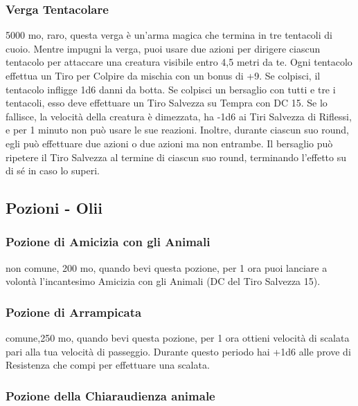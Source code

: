 \begin{multicols}{2}
\subsubsection*{Verga Tentacolare}
5000 mo, raro, questa verga è un'arma magica che termina in tre tentacoli di cuoio. Mentre impugni la verga, puoi usare due azioni per dirigere ciascun tentacolo per attaccare una creatura visibile entro 4,5 metri da te. Ogni tentacolo effettua un Tiro per Colpire da mischia con un bonus di +9. Se colpisci, il tentacolo infligge 1d6 danni da botta. Se colpisci un bersaglio con tutti e tre i tentacoli, esso deve effettuare un Tiro Salvezza su Tempra con DC 15. Se lo fallisce, la velocità della creatura è dimezzata, ha -1d6 ai Tiri Salvezza di Riflessi, e per 1 minuto non può usare le sue reazioni. Inoltre, durante ciascun suo round, egli può effettuare due azioni o due azioni ma non entrambe. Il bersaglio può ripetere il Tiro Salvezza al termine di ciascun suo round, terminando l'effetto su di sé in caso lo superi.


\subsection{Pozioni - Olii}

\subsubsection*{Pozione di Amicizia con gli Animali}

non comune, 200 mo, quando bevi questa pozione, per 1 ora puoi lanciare a volontà l'incantesimo Amicizia con gli Animali (DC del Tiro Salvezza 15).

\subsubsection*{Pozione di Arrampicata}

comune,250 mo, quando bevi questa pozione, per 1 ora ottieni velocità di scalata pari alla tua velocità di passeggio. Durante questo periodo hai +1d6 alle prove di Resistenza che compi per effettuare una scalata.

\subsubsection*{Pozione della Chiaraudienza animale}


\end{multicols}
